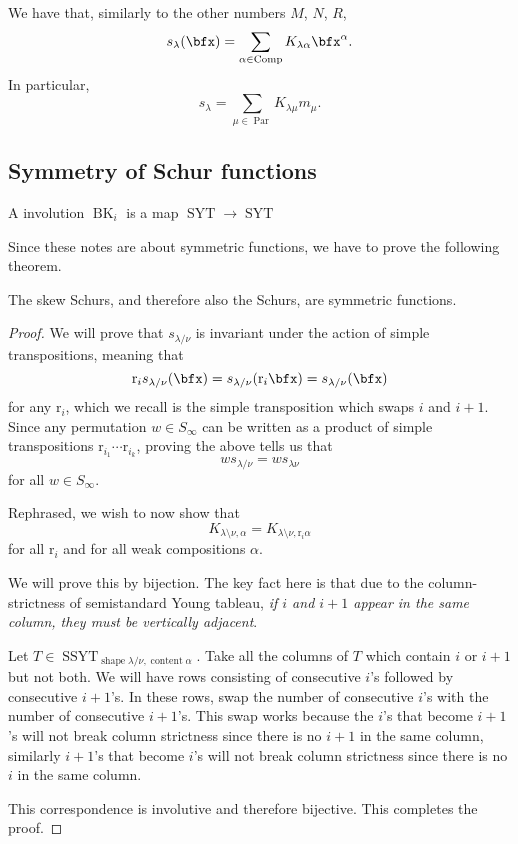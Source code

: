 \documentclass{article}
\DeclareMathOperator{\shape}{shape}
\DeclareMathOperator{\content}{content}
\DeclareMathOperator{\Par}{Par}
\DeclareMathOperator{\Com}{Comp}
\DeclareMathOperator{\SYT}{SYT}
\DeclareMathOperator{\SSYT}{SSYT}
\newcommand*\refl{\ensuremath{\text{r}}}
\DeclareMathOperator{\BK}{BK}
\begin{document}
\begin{remark}
    We have that, similarly to the other numbers $M$, $N$, $R$,
    \[
        s_\lambda(\bfx)
        = 
        \sum_{\alpha\in\Com} K_{\lambda\alpha}\bfx^\alpha.
    \]
    In particular,
    \[
        s_\lambda
        = 
        \sum_{\mu\in\Par} 
        K_{\lambda\mu}m_\mu.
    \]
\end{remark}

\subsection{Symmetry of Schur functions}


\begin{definition}
    A  involution $\BK_i$ is a map $\SYT \to \SYT$ 
\end{definition}

Since these notes are about symmetric functions, we have to prove the following theorem.

\begin{theorem} The skew Schurs, and therefore also the Schurs, are symmetric functions.
\end{theorem}

\begin{proof}
    We will prove that $s_{\lambda/\nu}$ is invariant under the action of simple transpositions, meaning that
    \[
        \refl_i s_{\lambda/\nu} (\bfx)
        = 
        s_{\lambda/\nu} (\refl_i \bfx)
        =
        s_{\lambda/\nu} (\bfx)
    \]
    for any $\refl_i$, which we recall is the simple transposition which swaps $i$ and $i+1$.
    Since any permutation $w \in S_\infty$ can be written as a product of simple transpositions $\refl_{i_1}\cdots \refl_{i_k}$, proving the above tells us that 
    \[
        ws_{\lambda/\nu} 
        = 
        ws_{\lambda\nu}
    \]
    for all $w \in S_\infty$.

    Rephrased, we wish to now show that 
    \[
        K_{\lambda\setminus\nu,\alpha} 
        = 
        K_{\lambda\setminus\nu,\refl_i\alpha}
    \]
    for all $\refl_i$ and for all weak compositions $\alpha$.

    We will prove this by bijection.
    The key fact here is that due to the column-strictness of semistandard Young tableau, \textit{if $i$ and $i+1$ appear in the same column, they must be vertically adjacent}. 

    Let $T\in\SSYT_{\shape \lambda/\nu,\content \alpha}$. 
    Take all the columns of $T$ which contain $i$ or $i+1$ but not both. 
    We will have rows consisting of consecutive $i$'s followed by consecutive $i+1$'s. 
    In these rows, swap the number of consecutive $i$'s with the number of consecutive $i+1$'s. 
    This swap works because the $i$'s that become $i+1$'s will not break column strictness since there is no $i+1$ in the same column, similarly $i+1$'s that become $i$'s will not break column strictness since there is no $i$ in the same column.

    This correspondence is involutive and therefore bijective. This completes the proof.
\end{proof}
\end{document}
